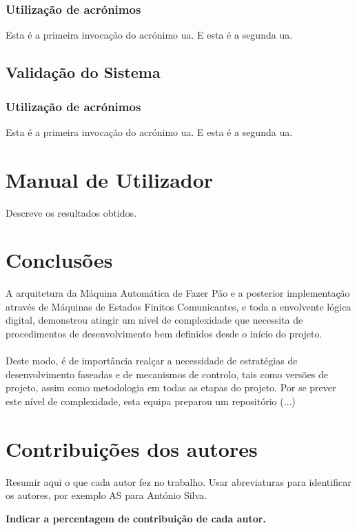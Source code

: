 \documentclass{report}
\begin{document}
\subsection{Utilização de acrónimos}
Esta é a primeira invocação do acrónimo \ac{ua}.
E esta é a segunda \ac{ua}.

\section{Validação do Sistema}

\subsection{Utilização de acrónimos}
Esta é a primeira invocação do acrónimo \ac{ua}.
E esta é a segunda \ac{ua}.

\chapter{Manual de Utilizador}
\label{chap.manualUtilizador}
Descreve os resultados obtidos.

\chapter{Conclusões}
\label{chap.conclusao}
A arquitetura da Máquina Automática de Fazer Pão e a posterior implementação através de Máquinas de Estados Finitos Comunicantes, e toda a envolvente lógica digital, demonstrou atingir um nível de complexidade que necessita de procedimentos de desenvolvimento bem definidos desde o início do projeto.
\\\\
Deste modo, é de importância realçar a necessidade de estratégias de desenvolvimento faseadas e de mecanismos de controlo, tais como versões de projeto, assim como metodologia em todas as etapas do projeto. Por se prever este nível de complexidade, esta equipa preparou um repositório (...)



\chapter*{Contribuições dos autores}
Resumir aqui o que cada autor fez no trabalho.
Usar abreviaturas para identificar os autores,
por exemplo AS para António Silva.

\vspace{10pt}
\textbf{Indicar a percentagem de contribuição de cada autor.}\\
\end{document}

